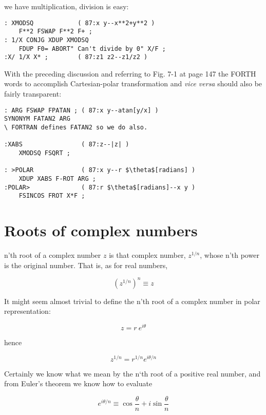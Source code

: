  we have multiplication, division is easy:

\begin{lstlisting}
: XMODSQ            ( 87:x y--x**2+y**2 )
    F**2 FSWAP F**2 F+ ;
: 1/X CONJG XDUP XMODSQ
    FDUP F0= ABORT" Can't divide by 0" X/F ;
:X/ 1/X X* ;        ( 87:z1 z2--z1/z2 )
\end{lstlisting}

With the preceding discussion and referring to Fig. 7-1 at page 147 the FORTH words to accomplish Cartesian-polar transformation and \textit{vice versa} should also be fairly transparent:

\begin{lstlisting}
: ARG FSWAP FPATAN ; ( 87:x y--atan[y/x] )
SYNONYM FATAN2 ARG
\ FORTRAN defines FATAN2 so we do also.

:XABS                ( 87:z--|z| )
    XMODSQ FSQRT ;

: >POLAR             ( 87:x y--r $\theta$[radians] )
    XDUP XABS F-ROT ARG ;
:POLAR>              ( 87:r $\theta$[radians]--x y )
    FSINCOS FROT X*F ;
\end{lstlisting}

\section{Roots of complex numbers}
 n'th root of a complex number $z$ is that complex number, $z^{1/n}$, whose n'th power is the original number. That is, as for real numbers,

\begin{equation}
  \left(z^{1/n}\right)^n \equiv z
\end{equation}

It might seem almost trivial to define the n’th root of a complex number in polar representation:

\begin{equation}
  z = r\ e^{i\theta}
\end{equation}

hence

\begin{equation}
  z^{1/n} = r^{1/n} e^{i\theta/n}
\end{equation}

Certainly we know what we mean by the n‘th root of a positive real number, and from Euler’s theorem we know how to evaluate

\begin{equation}
  e^{i\theta/n} \equiv \cos\frac{\theta}{n} + i \sin\frac{\theta}{n}
\end{equation}

